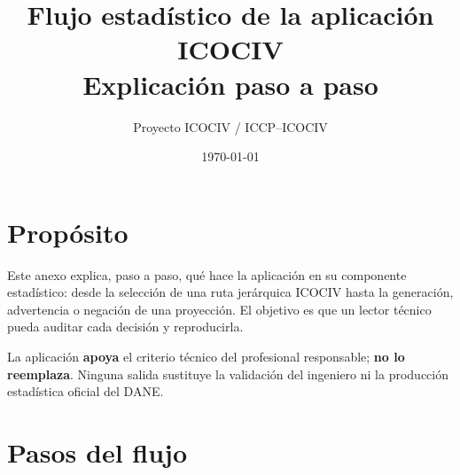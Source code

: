 \documentclass[11pt,letterpaper]{article}
\title{Flujo estadístico de la aplicación ICOCIV\\\large Explicación paso a paso}
\author{Proyecto ICOCIV / ICCP--ICOCIV}
\date{\today}
\begin{document}
\maketitle

\section{Propósito}

Este anexo explica, paso a paso, qué hace la aplicación en su componente
estadístico: desde la selección de una ruta jerárquica ICOCIV hasta la
generación, advertencia o negación de una proyección. El objetivo es que un
lector técnico pueda auditar cada decisión y reproducirla.

La aplicación \textbf{apoya} el criterio técnico del profesional responsable;
\textbf{no lo reemplaza}. Ninguna salida sustituye la validación del ingeniero
ni la producción estadística oficial del DANE.

\section{Pasos del flujo}
\end{document}
